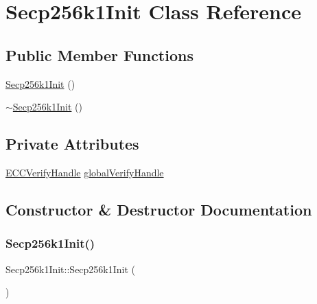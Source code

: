 \hypertarget{class_secp256k1_init}{}\section{Secp256k1\+Init Class Reference}
\label{class_secp256k1_init}
\subsection*{Public Member Functions}
\begin{DoxyCompactItemize}
\item 
\mbox{\hyperlink{class_secp256k1_init_a2b66e52b456b58659cb3c4b3adab862b}{Secp256k1\+Init}} ()
\item 
\mbox{\hyperlink{class_secp256k1_init_afc30fc1b48da30544d3365df6ed3e3f4}{$\sim$\+Secp256k1\+Init}} ()
\end{DoxyCompactItemize}
\subsection*{Private Attributes}
\begin{DoxyCompactItemize}
\item 
\mbox{\hyperlink{class_e_c_c_verify_handle}{E\+C\+C\+Verify\+Handle}} \mbox{\hyperlink{class_secp256k1_init_aff0f2f148a87cd9149ed587d8ee46cf5}{global\+Verify\+Handle}}
\end{DoxyCompactItemize}


\subsection{Constructor \& Destructor Documentation}
\mbox{\label{class_secp256k1_init_a2b66e52b456b58659cb3c4b3adab862b}} 
\subsubsection{\texorpdfstring{Secp256k1\+Init()}{Secp256k1Init()}}
{\footnotesize\ttfamily Secp256k1\+Init\+::\+Secp256k1\+Init (\begin{DoxyParamCaption}{ }\end{DoxyParamCaption})\hspace{0.3cm}{\ttfamily [inline]}}

\mbox{\label{class_secp256k1_init_afc30fc1b48da30544d3365df6ed3e3f4}} 
